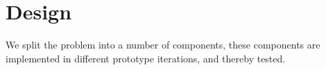 \chapter{Design}

We split the problem into a number of components, these components are implemented in different prototype iterations, and thereby tested. 




%

